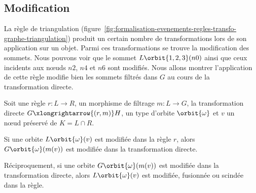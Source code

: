 \subsection{Modification}
\label{sec:formalisation-evenements-regles-transfo-graphe-modification}


La règle de triangulation
(figure~\ref{fig:formalisation-evenements-regles-transfo-graphe-triangulation})
produit un certain nombre de transformations lors de son application sur un
objet. %
Parmi ces transformations se trouve la modification des sommets. %
Nous pouvons voir que le sommet $L\orbit{1,2,3}(n0)$ ainsi que ceux incidents
aux n\oe uds $n2$, $n4$ et $n6$ sont modifiés. %
Nous allons montrer l'application de cette règle modifie bien les sommets
filtrés dans $G$ au cours de la transformation directe. %

\begin{proposition}
	\label{prop:base-rule-modify}
	Soit une règle $r : L \longrightarrow R$, un morphisme de filtrage $m : L \rightarrow G$, la transformation directe $G \xlongrightarrow{(r,m)} H$, un type d'orbite $\orbit{\omega}$ et $v$ un n\oe ud préservé de $K = L \cap R$.

	Si une orbite $L\orbit{\omega}(v)$ est modifiée
	dans la règle $r$, alors $G\orbit{\omega}(m(v))$ est
	modifiée dans la transformation directe.

	Réciproquement, si une orbite $G\orbit{\omega}(m(v))$ est modifiée dans la transformation directe, alors $L\orbit{\omega}(v)$ est modifiée, fusionnée ou scindée dans la règle.
\end{proposition}

